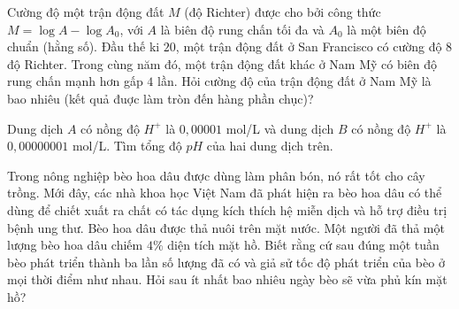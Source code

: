 \begin{ex}%
	Cường độ một trận động đất $M$ (độ Richter) được cho  bởi công thức $M=\log A-\log A_0$, với $A$ là biên độ rung chấn tối đa và $A_0$ là một biên độ chuẩn (hằng số). Đầu thế ki $20$, một trận động đất ở San Francisco có cường độ $8$ độ Richter. Trong cùng năm đó, một trận động đất khác ở Nam Mỹ có biên độ rung chấn mạnh hơn gấp $4$ lần. Hỏi cường độ của trận động đất ở Nam Mỹ là bao nhiêu (kết quả đuợc làm tròn đến hàng phần chục)?
\end{ex}

\begin{ex}%
	Dung dịch $A$ có nồng độ $H^+$ là $0{,}00001$ mol/L và dung dịch $B$ có nồng độ $H^+$ là $0{,}00000001$ mol/L. Tìm tổng độ $pH$ của  hai dung dịch trên.
\end{ex}

\begin{ex}%
	Trong nông nghiệp bèo hoa dâu được dùng làm phân bón, nó rất tốt cho cây trồng. Mới đây, các nhà khoa học Việt Nam đã phát hiện ra bèo hoa dâu có thể dùng để chiết xuất ra chất có tác dụng kích thích hệ miễn dịch và hỗ trợ điều trị bệnh ung thư. Bèo hoa dâu được thả nuôi trên mặt nước. Một  người đã thả một lượng bèo hoa dâu chiếm $4 \%$ diện tích mặt hồ. Biết rằng cứ sau đúng một tuần bèo phát triển thành ba lần số lượng đã có và giả sử tốc độ phát triển của bèo ở mọi thời điểm như nhau. Hỏi sau ít nhất bao nhiêu ngày bèo sẽ vừa phủ kín mặt hồ?
\end{ex}

